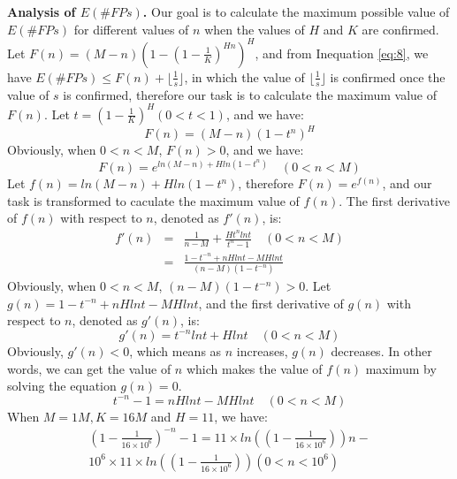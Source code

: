 \documentclass[conference]{IEEEtran}
\begin{document}
\textbf{Analysis of $E(\#FPs)$.}
Our goal is to calculate the maximum possible value of $E(\#FPs)$ for different values of $n$ when the values of $H$ and $K$ are confirmed. Let $F(n)=(M-n)(1-(1-\frac{1}{K})^{Hn})^H$, and from Inequation \ref{eq:8}, we have $E(\#FPs)\leq F(n)+\lfloor\frac{1}{s}\rfloor$, in which the value of $\lfloor\frac{1}{s}\rfloor$ is confirmed once the value of $s$ is confirmed, therefore our task is to calculate the maximum value of $F(n)$. Let $t=(1-\frac{1}{K})^{H}(0<t<1)$, and we have:
\begin{equation}\label{eq:16}
F(n)=(M-n)(1-t^n)^H
\end{equation}
Obviously, when $0<n<M$, $F(n)>0$, and we have:
\begin{equation}
F(n)=e^{ln(M-n)+Hln(1-t^n)} \quad (0<n<M)
\end{equation}
Let $f(n)=ln(M-n)+Hln(1-t^n)$, therefore $F(n)=e^{f(n)}$, and our task is transformed to caculate the maximum value of $f(n)$. The first derivative of $f(n)$ with respect to $n$, denoted as $f'(n)$, is:
\begin{eqnarray}
f'(n)&=&\frac{1}{n-M}+\frac{Ht^nlnt}{t^n-1} \quad (0<n<M)\\
&=&\frac{1-t^{-n}+nHlnt-MHlnt}{(n-M)(1-t^{-n})}
\end{eqnarray}
Obviously, when $0<n<M$, $(n-M)(1-t^{-n})>0$. Let $g(n)=1-t^{-n}+nHlnt-MHlnt$, and the first derivative of $g(n)$ with respect to $n$, denoted as $g'(n)$, is:
\begin{equation}
g'(n)=t^{-n}lnt+Hlnt\quad (0<n<M)
\end{equation}
Obviously, $g'(n)<0$, which means as $n$ increases, $g(n)$ decreases. In other words, we can get the value of $n$ which makes the value of $f(n)$ maximum by solving the equation $g(n)=0$.
\begin{equation}
t^{-n}-1=nHlnt-MHlnt\quad (0<n<M)
\end{equation}
When $M=1M,K=16M$ and $H=11$, we have:
\begin{eqnarray}\label{eq:matlab}
(1-\frac{1}{16\times 10^6})^{-n}-1=11\times ln((1-\frac{1}{16\times 10^6}))n-\nonumber\\
10^6\times 11\times ln((1-\frac{1}{16\times 10^6})) (0<n<10^6)
\end{eqnarray}
\end{document}

